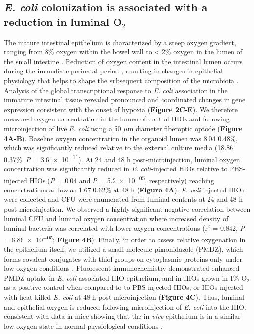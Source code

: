 \documentclass[9pt,lineo]{elife}
\begin{document}
\subsection*{{\bfseries\sffamily } \emph{E. coli} colonization is associated with a reduction in luminal O\(_{\text{2}}\)}
\label{sec:orgheadline6}
The mature intestinal epithelium is characterized by a steep oxygen gradient, ranging from 8\% oxygen within the bowel wall to < 2\% oxygen in the lumen of the small intestine \citep{Fisher:2013}. Reduction of oxygen content in the intestinal lumen occurs during the immediate perinatal period \citep{Gruette:1965}, resulting in changes in epithelial physiology \citep{Glover:2016,Kelly:2015,Colgan:2013,Zeitouni:2016} that helps to shape the subsequent composition of the microbiota \citep{Schmidt:2014,Espey:2013,Albenberg:2014,Palmer:2007,Koenig:2011}. Analysis of the global transcriptional response to \emph{E. coli} association in the immature intestinal tissue revealed pronounced and coordinated changes in gene expression consistent with the onset of hypoxia (\textbf{Figure 2C-E}). We therefore measured oxygen concentration in the lumen of control HIOs and following microinjection of live \emph{E. coli} using a 50 \(\mu\)m diameter fiberoptic optode (\textbf{Figure 4A-B}). Baseline oxygen concentration in the organoid lumen was 8.04 \textpm{} 0.48\%, which was significantly reduced relative to the external culture media (18.86 \textpm{} 0.37\%, \emph{P} = \num{3.6e-11}). At 24 and 48 h post-microinjection, luminal oxygen concentration was significantly reduced in \emph{E. coli}-injected HIOs relative to PBS-injected HIOs (\emph{P} = \num{0.04} and \emph{P} = \num{5.2e-05}, respectively) reaching concentrations as low as 1.67 \textpm{} 0.62\% at 48 h (\textbf{Figure 4A}). \emph{E. coli} injected HIOs were collected and CFU were enumerated from luminal contents at 24 and 48 h post-microinjection. We observed a highly significant negative correlation between luminal CFU and luminal oxygen concentration where increased density of luminal bacteria was correlated with lower oxygen concentrations (r\(^{\text{2}}\) = 0.842, \emph{P} = \num{6.86e-05}; \textbf{Figure 4B}). Finally, in order to assess relative oxygenation in the epithelium itself, we utilized a small molecule pimonidazole (PMDZ), which forms covalent conjugates with thiol groups on cytoplasmic proteins only under low-oxygen conditions \citep{Arteel:1998}. Fluorescent immunochemistry demonstrated enhanced PMDZ uptake in \emph{E. coli} associated HIO epithelium, and in HIOs grown in 1\% O\(_{\text{2}}\) as a positive control when compared to to PBS-injected HIOs, or HIOs injected with heat killed \emph{E. coli} at 48 h post-microinjection (\textbf{Figure 4C}). Thus, luminal and epithelial oxygen is reduced following microinjection of \emph{E. coli} into the HIO, consistent with data in mice showing that the in \emph{vivo} epithelium is in a similar low-oxygen state in normal physiological conditions \citep{Schmidt:2014,Kelly:2015,Kim:2017}.
\end{document}
